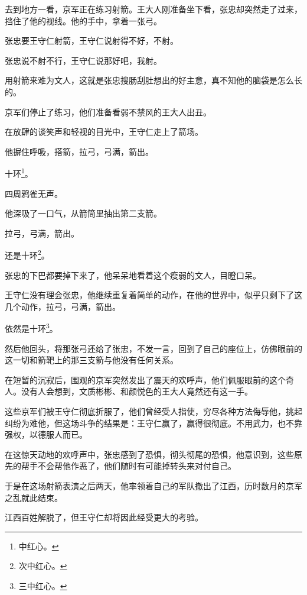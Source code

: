 \begin{multicols}{\theparacolNo}
去到地方一看，京军正在练习射箭。王大人刚准备坐下看，张忠却突然走了过来，挡住了他的视线。他的手中，拿着一张弓。

张忠要王守仁射箭，王守仁说射得不好，不射。

张忠说不射不行，王守仁说那好吧，我射。

用射箭来难为文人，这就是张忠搜肠刮肚想出的好主意，真不知他的脑袋是怎么长的。

京军们停止了练习，他们准备看弱不禁风的王大人出丑。

在放肆的谈笑声和轻视的目光中，王守仁走上了箭场。

他摒住呼吸，搭箭，拉弓，弓满，箭出。

十环\footnote{中红心。}。

四周鸦雀无声。

他深吸了一口气，从箭筒里抽出第二支箭。

拉弓，弓满，箭出。

还是十环\footnote{次中红心。}。

张忠的下巴都要掉下来了，他呆呆地看着这个瘦弱的文人，目瞪口呆。

王守仁没有理会张忠，他继续重复着简单的动作，在他的世界中，似乎只剩下了这几个动作，拉弓，弓满，箭出。

依然是十环\footnote{三中红心。}。

然后他回头，将那张弓还给了张忠，不发一言，回到了自己的座位上，仿佛眼前的这一切和箭靶上的那三支箭与他没有任何关系。

在短暂的沉寂后，围观的京军突然发出了震天的欢呼声，他们佩服眼前的这个奇人。没有人会想到，文质彬彬、和颜悦色的王大人竟然还有这一手。

这些京军们被王守仁彻底折服了，他们曾经受人指使，穷尽各种方法侮辱他，挑起纠纷为难他，但这场斗争的结果是：王守仁赢了，赢得很彻底。不用武力，也不靠强权，以德服人而已。

在这惊天动地的欢呼声中，张忠感到了恐惧，彻头彻尾的恐惧，他意识到，这些原先的帮手不会帮他作恶了，他们随时有可能掉转头来对付自己。

于是在这场射箭表演之后两天，他率领着自己的军队撤出了江西，历时数月的京军之乱就此结束。

江西百姓解脱了，但王守仁却将因此经受更大的考验。
\ifnum{}
	\end{multicols}
\fi
\newpage
